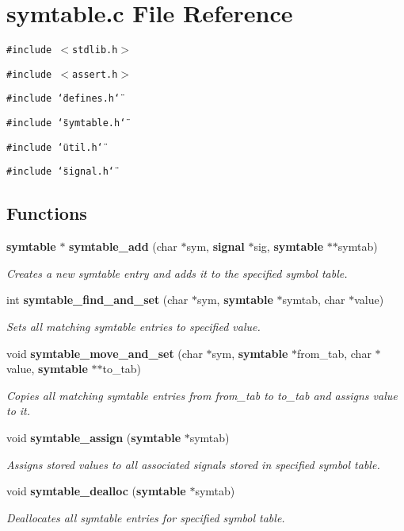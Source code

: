 \section{symtable.c File Reference}
\label{symtable_8c}
{\tt \#include $<$stdlib.h$>$}\par
{\tt \#include $<$assert.h$>$}\par
{\tt \#include \char`\"{}defines.h\char`\"{}}\par
{\tt \#include \char`\"{}symtable.h\char`\"{}}\par
{\tt \#include \char`\"{}util.h\char`\"{}}\par
{\tt \#include \char`\"{}signal.h\char`\"{}}\par
\subsection*{Functions}
\begin{CompactItemize}
\item 
{\bf symtable} $\ast$ {\bf symtable\_\-add} (char $\ast$sym, {\bf signal} $\ast$sig, {\bf symtable} $\ast$$\ast$symtab)
\begin{CompactList}\small\item\em Creates a new symtable entry and adds it to the specified symbol table.\item\end{CompactList}\item 
int {\bf symtable\_\-find\_\-and\_\-set} (char $\ast$sym, {\bf symtable} $\ast$symtab, char $\ast$value)
\begin{CompactList}\small\item\em Sets all matching symtable entries to specified value.\item\end{CompactList}\item 
void {\bf symtable\_\-move\_\-and\_\-set} (char $\ast$sym, {\bf symtable} $\ast$from\_\-tab, char $\ast$value, {\bf symtable} $\ast$$\ast$to\_\-tab)
\begin{CompactList}\small\item\em Copies all matching symtable entries from from\_\-tab to to\_\-tab and assigns value to it.\item\end{CompactList}\item 
void {\bf symtable\_\-assign} ({\bf symtable} $\ast$symtab)
\begin{CompactList}\small\item\em Assigns stored values to all associated signals stored in specified symbol table.\item\end{CompactList}\item 
void {\bf symtable\_\-dealloc} ({\bf symtable} $\ast$symtab)
\begin{CompactList}\small\item\em Deallocates all symtable entries for specified symbol table.\item\end{CompactList}\end{CompactItemize}


